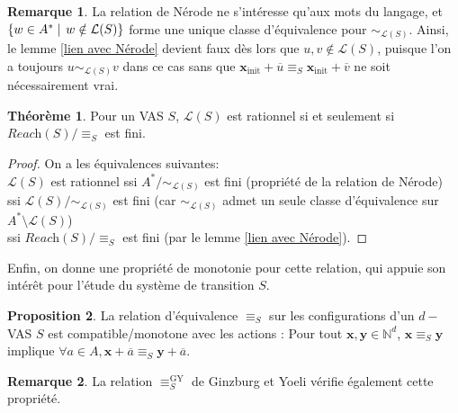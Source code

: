 \documentclass[a4paper,final]{article}
\theoremstyle{definition}
\newtheorem{Theorem}{Théorème}
\newtheorem{Proposition}[Theorem]{Proposition}
\newtheorem*{Remark}{Remarque}
\newcommand{\alain}[1]{\textcolor{blue}{#1}}
\newcommand{\set}[2]{\left\{#1\mathrel{\left|\vphantom{#1}\vphantom{#2}\right.}#2\right\}}
\newcommand{\N}{\ensuremath{\mathbb{N}}}
\newcommand{\lang}{\ensuremath{\mathcal{L}}}
\newcommand{\reach}{\ensuremath{\textit{Reach}}}
\newcommand{\vect}[1]{\ensuremath{\mathbf{#1}}}
\newcommand{\rel}{\ensuremath{\equiv}}
\newcommand{\relGY}{\ensuremath{\equiv^\text{GY}_S}}
\newcommand{\xinit}{\ensuremath{\vect{x}_\text{init}}}
\newcommand{\valeur}[1]{\ensuremath{\overline{#1}}}
\begin{document}

\begin{Remark}
La relation de Nérode ne s'intéresse qu'aux mots du langage, et $\set{w\in A^\ast}{w\notin\lang(S)}$ forme une unique classe d'équivalence pour $\sim_{\lang(S)}$.
Ainsi, le lemme \ref{lien avec Nérode} devient faux dès lors que $u,v\notin\lang(S)$, puisque l'on a toujours $u\sim_{\lang(S)}v$ dans ce cas sans que $\xinit +\valeur{u} \rel_S \xinit +\valeur{v}$ ne soit nécessairement vrai.
\end{Remark}


\begin{Theorem}\label{lien relation-rationnel}
    Pour un VAS $S$, $\lang(S)$ est rationnel si et seulement si $\reach(S)/\rel_S$ est fini.
\end{Theorem}

\begin{proof}
On a les équivalences suivantes: \\
$\lang(S)$ est rationnel 
ssi $A^\ast/\sim_{\lang(S)}$ est fini (propriété de la relation de Nérode) \\
ssi $\lang(S)/\sim_{\lang(S)}$ est fini (car $\sim_{\lang(S)}$ admet un seule classe d'équivalence sur $A^\ast \setminus \lang(S)$) \\
ssi $\reach(S)/\rel_S$ est fini (par le lemme \ref{lien avec Nérode}).
\end{proof}

Enfin, on donne une propriété de monotonie pour cette relation, qui appuie son intérêt pour l'étude du système de transition $S$.

\begin{Proposition}\label{Monotonie relation}
La relation d'équivalence $\rel_S$ sur les configurations d'un $d-$VAS $S$ est compatible/monotone avec les actions :
Pour tout $\vect{x},\vect{y} \in\N^d$, $\vect{x}\rel_S \vect{y}$ implique $\forall a\in A, \vect{x} +\valeur{a} \rel_S \vect{y} +\valeur{a}$.
\end{Proposition}

\begin{Remark}
La relation $\relGY$ de Ginzburg et Yoeli vérifie également cette propriété.
\end{Remark}
\end{document}
